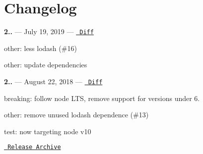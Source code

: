 \chapter{Changelog}
\hypertarget{md__2_users_2hello_2_documents_2_git_hub_2finalproject-engine-drop-table-engines_2_engine_2src_2ab544d9ed93616f22a64217fc58e5326}{}\label{md__2_users_2hello_2_documents_2_git_hub_2finalproject-engine-drop-table-engines_2_engine_2src_2ab544d9ed93616f22a64217fc58e5326}
\label{md__2_users_2hello_2_documents_2_git_hub_2finalproject-engine-drop-table-engines_2_engine_2src_2ab544d9ed93616f22a64217fc58e5326_autotoc_md2334}%
%


{\bfseries{2..}} — 
\footnotesize  July 19, 2019 
\normalsize  — \href{https://github.com/archiverjs/archiver-utils/compare/2.0.0...2.1.0}{\texttt{ Diff}}


\begin{DoxyItemize}
\item other\+: less lodash (\#16)
\item other\+: update dependencies
\end{DoxyItemize}

{\bfseries{2..}} — 
\footnotesize  August 22, 2018 
\normalsize  — \href{https://github.com/archiverjs/archiver-utils/compare/1.3.0...2.0.0}{\texttt{ Diff}}


\begin{DoxyItemize}
\item breaking\+: follow node LTS, remove support for versions under 6.
\item other\+: remove unused lodash dependence (\#13)
\item test\+: now targeting node v10
\end{DoxyItemize}

\href{https://github.com/archiverjs/archiver-utils/releases}{\texttt{ Release Archive}} 